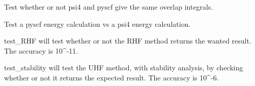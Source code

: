 \documentclass[letterpaper,10pt,english]{sphinxmanual}
\begin{document}
\begin{fulllineitems}
\label{\detokenize{tests:ghf.tests.test_auth.test_overlap}}
Test whether or not psi4 and pyscf give the same overlap integrals.

\end{fulllineitems}


\begin{fulllineitems}
\label{\detokenize{tests:ghf.tests.test_auth.test_pyscf_vs_psi4}}
Test a pyscf energy calculation vs a psi4 energy calculation.

\end{fulllineitems}


\begin{fulllineitems}
\label{\detokenize{tests:ghf.tests.test_auth.test_rhf}}
test\_RHF will test whether or not the RHF method returns the wanted result. The accuracy is 10\textasciicircum{}-11.

\end{fulllineitems}


\begin{fulllineitems}
\label{\detokenize{tests:ghf.tests.test_auth.test_stability}}
test\_stability will test the UHF method, with stability analysis, by checking whether or not it returns
the expected result. The accuracy is 10\textasciicircum{}-6.

\end{fulllineitems}

\end{document}
